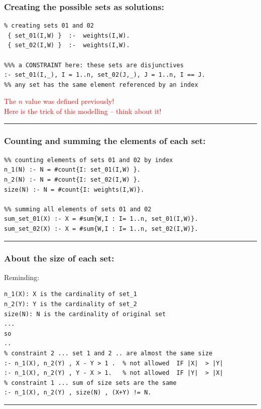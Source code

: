 \documentclass{beamer}
\begin{document}

\begin{frame}[fragile] 
	\frametitle{Creating the possible sets as solutions:}
	
{\small
\begin{verbatim}
% creating sets 01 and 02
 { set_01(I,W) }  :-  weights(I,W).
 { set_02(I,W) }  :-  weights(I,W).

%%% a CONSTRAINT here: these sets are disjunctives
:- set_01(I,_), I = 1..n, set_02(J,_), J = 1..n, I == J.
%% any set has the same element referenced by an index

\end{verbatim}
}	
\textcolor{red}{The $n$ value was defined previously!}\\
\textcolor{red}{Here is the trick of this modelling -- think about it!}\\
\textcolor{red}{\rule{\textwidth}{1.7pt} } 
\end{frame}


\begin{frame}[fragile] 
	\frametitle{Counting and summing the elements of each set:}
	
{\small
\begin{verbatim}
%% counting elements of sets 01 and 02 by index
n_1(N) :- N = #count{I: set_01(I,W) }.
n_2(N) :- N = #count{I: set_02(I,W) }.
size(N) :- N = #count{I: weights(I,W)}.

%% summing all elements of sets 01 and 02
sum_set_01(X) :- X = #sum{W,I : I= 1..n, set_01(I,W)}.
sum_set_02(X) :- X = #sum{W,I : I= 1..n, set_02(I,W)}.
\end{verbatim}
}	
\textcolor{red}{\rule{\textwidth}{1.7pt} } 
\end{frame}



\begin{frame}[fragile]
	\frametitle{About the size of each set:}

Reminding:
{\small
\begin{verbatim}
n_1(X): X is the cardinality of set_1 
n_2(Y): Y is the cardinality of set_2 
size(N): N is the cardinality of original set
...
so
..
% constraint 2 ... set 1 and 2 .. are almost the same size
:- n_1(X), n_2(Y) , X - Y > 1 .  % not allowed  IF |X|  > |Y|  
:- n_1(X), n_2(Y) , Y - X > 1.   % not allowed  IF |Y|  > |X|
% constraint 1 ... sum of size sets are the same
:- n_1(X), n_2(Y) , size(N) , (X+Y) != N.

\end{verbatim}
}	
\textcolor{red}{\rule{\textwidth}{1.7pt} } 
\end{frame}
\end{document}
